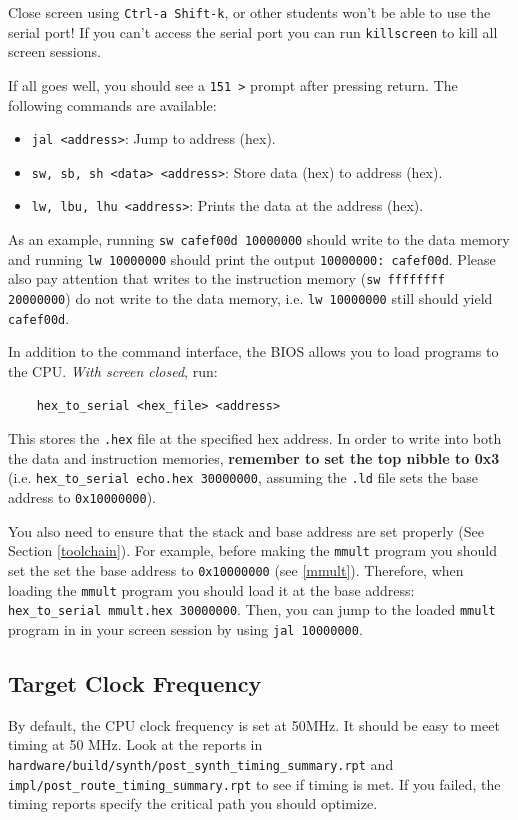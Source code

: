 \documentclass[11pt]{article}
\begin{document}
Close screen using \verb|Ctrl-a Shift-k|, or other students won't be able to use the serial port!
If you can't access the serial port you can run \verb|killscreen| to kill all screen sessions.

If all goes well, you should see a \verb|151 >| prompt after pressing return. The following commands are available:
\begin{itemize}
    \item \verb|jal <address>|: Jump to address (hex).
    \item \verb|sw, sb, sh <data> <address>|: Store data (hex) to address (hex).
    \item \verb|lw, lbu, lhu <address>|: Prints the data at the address (hex).
\end{itemize}

As an example, running \verb|sw cafef00d 10000000| should write to the data memory and running \verb|lw 10000000| should print the output \verb|10000000: cafef00d|.
Please also pay attention that writes to the instruction memory (\verb|sw ffffffff 20000000|) do not write to the data memory, i.e. \verb|lw 10000000| still should yield \verb|cafef00d|.

In addition to the command interface, the BIOS allows you to load programs to the CPU. \textit{With screen closed}, run:
\begin{verbatim}
    hex_to_serial <hex_file> <address>
\end{verbatim}

This stores the \verb|.hex| file at the specified hex address.
In order to write into both the data and instruction memories, \textbf{remember to set the top nibble to 0x3} (i.e. \verb|hex_to_serial echo.hex 30000000|, assuming the \verb|.ld| file sets the base address to \verb|0x10000000|).

You also need to ensure that the stack and base address are set properly (See Section \ref{toolchain}).
For example, before making the \verb|mmult| program you should set the set the base address to \verb|0x10000000| (see \ref{mmult}).
Therefore, when loading the \verb|mmult| program you should load it at the base address: \verb|hex_to_serial mmult.hex 30000000|.
Then, you can jump to the loaded \verb|mmult| program in in your screen session by using \verb|jal 10000000|.

\subsection{Target Clock Frequency}
By default, the CPU clock frequency is set at 50MHz.
It should be easy to meet timing at 50 MHz.
Look at the reports in \verb|hardware/build/synth/post_synth_timing_summary.rpt| and \verb|impl/post_route_timing_summary.rpt| to see if timing is met.
If you failed, the timing reports specify the critical path you should optimize.
\end{document}
